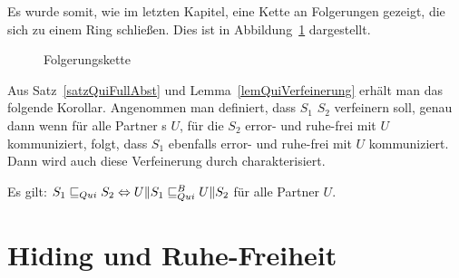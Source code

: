 Es wurde somit, wie im letzten Kapitel, eine Kette an Folgerungen gezeigt, die
sich zu einem Ring schließen. Dies ist in Abbildung~\ref{FolgerungsketteQui}
dargestellt.

\begin{figure}[h!tbp]
  \begin{center}
    \caption{Folgerungskette}
\label{FolgerungsketteQui}
  \end{center}
\end{figure}

Aus Satz~\ref{satzQuiFullAbst} und Lemma~\ref{lemQuiVerfeinerung} erhält man
das folgende Korollar. Angenommen man definiert, dass $S_1$ $S_2$ verfeinern
soll, genau dann wenn für alle Partner \EIO{}s $U$, für die $S_2$ error- und
ruhe-frei mit $U$ kommuniziert, folgt, dass $S_1$ ebenfalls error- und
ruhe-frei mit $U$ kommuniziert. Dann wird auch diese Verfeinerung durch \QRel{}
charakterisiert.

\begin{kor}
  Es gilt: $S_1\sqsubseteq _{Qui} S_2\Leftrightarrow U\|S_1\sqsubseteq _{Qui}^B U\|S_2$ für alle Partner
  $U$.
\end{kor}

\section{Hiding und Ruhe-Freiheit}

